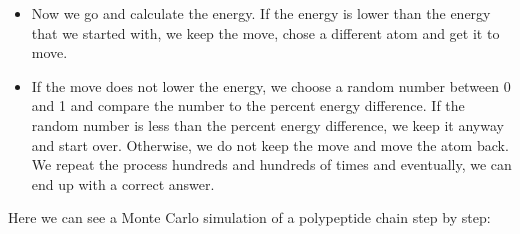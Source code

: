 \documentclass[12pt]{article}
\begin{document}
\begin{enumerate}
\begin{itemize}
            \item Now we go and calculate the energy. If the energy is lower than the energy that we started with, we keep the move, chose a different atom and get it to move.
            \item If the move does not lower the energy, we choose a random number between 0 and 1 and compare the number to the percent energy difference. If the random number is less than the percent energy difference, we keep it anyway and start over. Otherwise, we do not keep the move and move the atom back. We repeat the process hundreds and hundreds of times and eventually, we can end up with a correct answer.
        \end{itemize}
    \end{enumerate}
    Here we can see a Monte Carlo simulation of a polypeptide chain step by step: 
\end{document}
